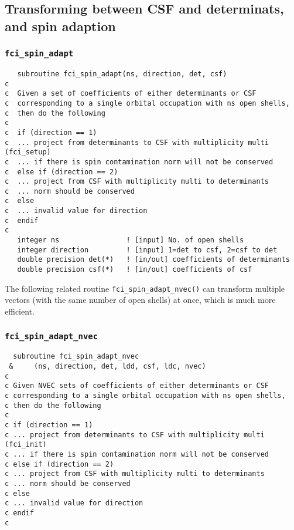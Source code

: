\documentclass[fullpage,12pt,fleqn]{article}
\begin{document}
\subsection{Transforming between CSF and determinats, and spin adaption}

\subsubsection{{\tt fci\_spin\_adapt}}
\label{spinad1}
\begin{verbatim}
   subroutine fci_spin_adapt(ns, direction, det, csf)
c     
c  Given a set of coefficients of either determinants or CSF
c  corresponding to a single orbital occupation with ns open shells,
c  then do the following
c     
c  if (direction == 1)
c  ... project from determinants to CSF with multiplicity multi (fci_setup)
c  ... if there is spin contamination norm will not be conserved
c  else if (direction == 2)
c  ... project from CSF with multiplicity multi to determinants
c  ... norm should be conserved
c  else
c  ... invalid value for direction
c  endif
c     
   integer ns                ! [input] No. of open shells
   integer direction         ! [input] 1=det to csf, 2=csf to det
   double precision det(*)   ! [in/out] coefficients of determinants
   double precision csf(*)   ! [in/out] coefficients of csf
\end{verbatim}

The following related routine \verb!fci_spin_adapt_nvec()! can
transform multiple vectors (with the same number of open shells) at
once, which is much more efficient.

\subsubsection{{\tt fci\_spin\_adapt\_nvec}}
\begin{verbatim}
  subroutine fci_spin_adapt_nvec
 &     (ns, direction, det, ldd, csf, ldc, nvec)
c     
c Given NVEC sets of coefficients of either determinants or CSF
c corresponding to a single orbital occupation with ns open shells,
c then do the following
c   
c if (direction == 1)
c ... project from determinants to CSF with multiplicity multi (fci_init)
c ... if there is spin contamination norm will not be conserved
c else if (direction == 2)
c ... project from CSF with multiplicity multi to determinants
c ... norm should be conserved
c else
c ... invalid value for direction
c endif
c     
\end{verbatim}
\end{document}

